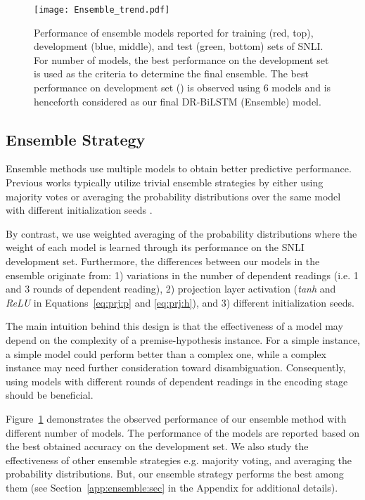 \documentclass[11pt,a4paper]{article}
\begin{document}
	\begin{figure}[ht]
		\centering
		\texttt{[image: Ensemble\_trend.pdf]}
		\caption{Performance of  ensemble models reported for training (red, top), development (blue, middle), and test (green, bottom) sets of SNLI. For  number of models, the best performance on the development set is used as the criteria to determine the final ensemble. The best performance on development set () is observed using 6 models and is henceforth considered as our final DR-BiLSTM (Ensemble) model. \label{fig:ensemble}}
	\end{figure}
	
	\subsection{Ensemble Strategy} \label{sec:es}
	Ensemble methods use multiple models to obtain better predictive performance. Previous works typically utilize trivial ensemble strategies by either using majority votes or averaging the probability distributions over the same model with different initialization seeds \cite{ibm2017,gong2017}. 
	
	By contrast, we use weighted averaging of the probability distributions where the weight of each model is learned through its performance on the SNLI development set. Furthermore, the differences between our models in the ensemble originate from: 1) variations in the number of dependent readings (i.e. 1 and 3 rounds of dependent reading), 2) projection layer activation (\emph{tanh} and \emph{ReLU} in Equations~\ref{eq:prj:p} and \ref{eq:prj:h}), and 3) different initialization seeds. 
	
	The main intuition behind this design is that the effectiveness of a model may depend on the complexity of a premise-hypothesis instance. For a simple instance, a simple model could perform better than a complex one, while a complex instance may need further consideration toward disambiguation. Consequently, using models with different rounds of dependent readings in the encoding stage should be beneficial. 
	
	Figure~\ref{fig:ensemble} demonstrates the observed performance of our ensemble method with different number of models. The performance of the models are reported based on the best obtained accuracy on the development set. We also study the effectiveness of other ensemble strategies e.g. majority voting, and averaging the probability distributions. But, our ensemble strategy performs the best among them (see Section~\ref{app:ensemble:sec} in the Appendix for additional details).
	
\end{document}
